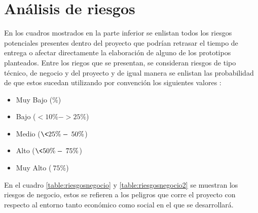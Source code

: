 \section{Análisis de riesgos}
En los cuadros mostrados en la parte inferior se enlistan todos los riesgos potenciales presentes dentro del proyecto que podrían retrasar el tiempo de entrega o afectar directamente la elaboración de alguno de los prototipos planteados. Entre los riegos que se presentan, se consideran riesgos de tipo técnico, de negocio y del proyecto y de igual manera se enlistan las probabilidad de que estos sucedan utilizando por convención los siguientes valores \cite{Riesgos}: \\

\FloatBarrier
\begin{itemize}
\item Muy Bajo (\%)
\item Bajo ($<10\% - >25\%$)
\item Medio ($\<25\% - \>50\%$)
\item Alto ($\<50\% - \>75\%$)
\item Muy Alto ($\>75\%$) 
\end{itemize}
\FloatBarrier
En el cuadro \ref{table:riesgosnegocio} y \ref{table:riesgosnegocio2} se muestran los riesgos de negocio, estos se refieren a los peligros que corre el proyecto con respecto al entorno tanto económico como social en el que se desarrollará.
\FloatBarrier
